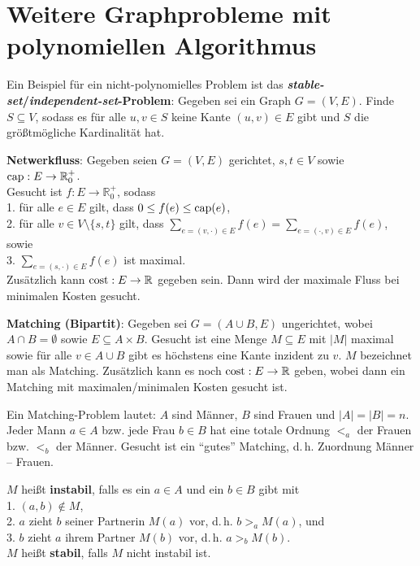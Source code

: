 \section{%
    Weitere Graphprobleme mit polynomiellen Algorithmus%
}

Ein Beispiel für ein nicht-polynomielles Problem ist
das \textbf{\emph{stable-set}/\emph{independent-set}-Pro\-blem}:
Gegeben sei ein Graph $G = (V, E)$.
Finde $S \subseteq V$, sodass es für alle $u, v \in S$ keine Kante
$(u, v) \in E$ gibt und $S$ die größtmögliche Kardinalität hat.

\linie

\textbf{Netwerkfluss}:
Gegeben seien $G = (V, E)$ gerichtet, $s, t \in V$ sowie
$\operatorname{cap}: E \rightarrow \mathbb{R}_0^+$. \\
Gesucht ist $f: E \rightarrow \mathbb{R}_0^+$, sodass \\
1. \quad für alle $e \in E$ gilt, dass $0 \le f(e) \le \operatorname{cap}(e)$, \\
2. \quad für alle $v \in V \setminus \{s, t\}$ gilt, dass
$\sum_{e = (v, \cdot) \in E} f(e) = \sum_{e = (\cdot, v) \in E} f(e)$, sowie \\
3. \quad $\sum_{e = (s, \cdot) \in E} f(e)$ ist maximal. \\
Zusätzlich kann $\operatorname{cost}: E \rightarrow \mathbb{R}$ gegeben sein.
Dann wird der maximale Fluss bei minimalen Kosten gesucht.

\linie
\pagebreak

\textbf{Matching (Bipartit)}:
Gegeben sei $G = (A \cup B, E)$ ungerichtet, wobei
$A \cap B = \emptyset$ sowie $E \subseteq A \times B$.
Gesucht ist eine Menge $M \subseteq E$ mit $|M|$ maximal sowie
für alle $v \in A \cup B$ gibt es höchstens eine Kante inzident zu $v$.
$M$ bezeichnet man als Matching.
Zusätzlich kann es noch $\operatorname{cost}: E \rightarrow \mathbb{R}$ geben, wobei
dann ein Matching mit maximalen/minimalen Kosten gesucht ist.

Ein Matching-Problem lautet:
$A$ sind Männer, $B$ sind Frauen und $|A| = |B| = n$.
Jeder Mann $a \in A$ bzw. jede Frau $b \in B$ hat eine totale Ordnung
$<_a$ der Frauen bzw. $<_b$ der Männer.
Gesucht ist ein "`gutes"' Matching, d.\,h. Zuordnung Männer -- Frauen.

$M$ heißt \textbf{instabil}, falls es ein $a \in A$ und ein $b \in B$ gibt
mit \\
1. \quad $(a, b) \notin M$, \\
2. \quad $a$ zieht $b$ seiner Partnerin $M(a)$ vor, d.\,h. $b >_a M(a)$, und \\
3. \quad $b$ zieht $a$ ihrem Partner $M(b)$ vor, d.\,h. $a >_b M(b)$. \\
$M$ heißt \textbf{stabil}, falls $M$ nicht instabil ist.

